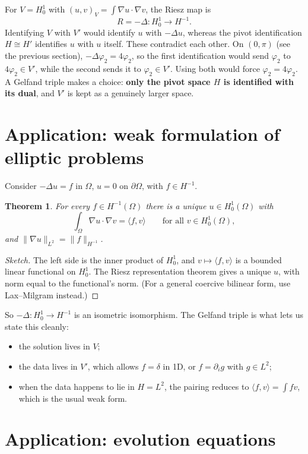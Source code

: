 \documentclass[11pt]{article}
\newcommand{\pair}[2]{\langle #1, #2 \rangle}
\newcommand{\ip}[2]{( #1, #2 )}
\newcommand{\lap}{\Delta}
\newcommand{\grad}{\nabla}
\theoremstyle{definition}
\theoremstyle{plain}
\newtheorem*{theorem}{Theorem}
\begin{document}
For $V=H^1_0$ with $\ip{u}{v}_V=\int\grad u\cdot\grad v$, the Riesz map is
\[
  R = -\lap : H^1_0\to H^{-1}.
\]
Identifying $V$ with $V'$ would identify $u$ with $-\lap u$, whereas the pivot
identification $H\cong H'$ identifies $u$ with $u$ itself. These contradict each
other. On $(0,\pi)$ (see the previous section), $-\lap\varphi_2=4\varphi_2$, so
the first identification would send $\varphi_2$ to $4\varphi_2\in V'$, while the
second sends it to $\varphi_2\in V'$. Using both would force
$\varphi_2=4\varphi_2$. A Gelfand triple makes a choice: \textbf{only the pivot space
$H$ is identified with its dual}, and $V'$ is kept as a genuinely larger space.

\section{Application: weak formulation of elliptic problems}

Consider $-\lap u=f$ in $\Omega$, $u=0$ on $\partial\Omega$, with $f\in H^{-1}$.

\begin{theorem}
For every $f\in H^{-1}(\Omega)$ there is a unique $u\in H^1_0(\Omega)$ with
\[
  \int_\Omega \grad u\cdot\grad v = \pair{f}{v}
  \qquad\text{for all } v\in H^1_0(\Omega),
\]
and $\|\grad u\|_{L^2}=\|f\|_{H^{-1}}$.
\end{theorem}

\begin{proof}[Sketch]
The left side is the inner product of $H^1_0$, and $v\mapsto\pair{f}{v}$ is a
bounded linear functional on $H^1_0$. The Riesz representation theorem gives a
unique $u$, with norm equal to the functional's norm. (For a general coercive
bilinear form, use Lax--Milgram instead.)
\end{proof}

So $-\lap:H^1_0\to H^{-1}$ is an isometric isomorphism. The Gelfand triple is
what lets us state this cleanly:
\begin{itemize}
  \item the solution lives in $V$;
  \item the data lives in $V'$, which allows $f=\delta$ in 1D, or
    $f=\partial_i g$ with $g\in L^2$;
  \item when the data happens to lie in $H=L^2$, the pairing reduces to
    $\pair{f}{v}=\int fv$, which is the usual weak form.
\end{itemize}

\section{Application: evolution equations}
\end{document}
